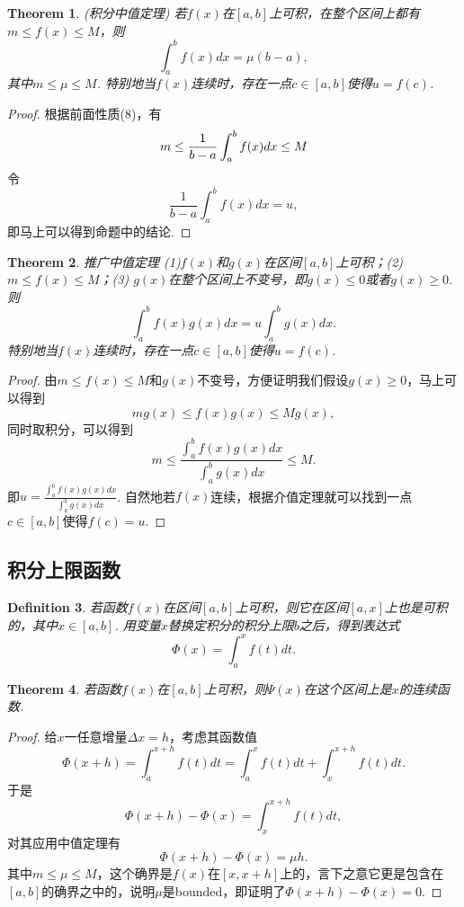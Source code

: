\documentclass{article}
\newtheorem{theorem}{Theorem}[section]
\newtheorem{definition}[theorem]{Definition}
\begin{document}
\begin{theorem}
\rm {\color{red} (积分中值定理) } 若$f(x)$在$[a,b]$上可积，在整个区间上都有$m \leq f(x) \leq M$，则
$$
\int_a^b f(x)dx = \mu(b-a),
$$
其中$m\leq \mu \leq M$. 特别地当$f(x)$连续时，存在一点$c\in [a,b]$使得$u=f(c)$.  
\end{theorem}

\begin{proof}
根据前面性质(8)，有
$$
m \leq \frac{1}{b-a}\int_a^b f(x)dx \leq M \\
$$
令
$$
\frac{1}{b-a}\int_a^b f(x)dx = u,
$$
即马上可以得到命题中的结论.
\end{proof}

\begin{theorem}
\rm {\color{red} 推广中值定理} (1)$f(x)$和$g(x)$在区间$[a,b]$上可积；(2)$m\leq f(x) \leq M$；(3) $g(x)$在整个区间上不变号，即$g(x) \leq 0$或者$g(x) \geq 0$. 则
$$
\int_a^b f(x)g(x)dx = u\int_a^b g(x)dx.
$$
特别地当$f(x)$连续时，存在一点$c\in [a,b]$使得$u=f(c)$.  
\end{theorem}

\begin{proof}
由$m \leq f(x) \leq M$和$g(x)$不变号，方便证明我们假设$g(x) \geq 0$，马上可以得到
$$
mg(x) \leq f(x)g(x) \leq Mg(x),
$$
同时取积分，可以得到
$$
m \leq \frac{\int_a^b f(x)g(x)dx}{\int_a^b g(x)dx} \leq M.
$$
即$u = \frac{\int_a^b f(x)g(x)dx}{\int_a^b g(x)dx}$. 自然地若$f(x)$连续，根据介值定理就可以找到一点$c \in [a,b]$使得$f(c) = u$.
\end{proof}




\subsection{积分上限函数}

\begin{definition}
\rm 若函数$f(x)$在区间$[a,b]$上可积，则它在区间$[a,x]$上也是可积的，其中$x \in [a,b]$. 用变量$x$替换定积分的积分上限$b$之后，得到表达式
$$
\Phi(x) = \int_a^x f(t)dt.
$$
\end{definition}

\begin{theorem}
\rm 若函数$f(x)$在$[a,b]$上可积，则$\Psi(x)$在这个区间上是$x$的连续函数.
\end{theorem}

\begin{proof}
给$x$一任意增量$\Delta x = h$，考虑其函数值
$$
\Phi(x+h) = \int_a^{x+h} f(t)dt = \int_a^x f(t)dt  + \int_x^{x+h} f(t)dt.
$$
于是
$$
\Phi(x+h) - \Phi(x) = \int_x^{x+h} f(t)dt,
$$
对其应用中值定理有
$$
\Phi(x+h) - \Phi(x)  = \mu h.
$$
其中$m \leq \mu \leq M$，这个确界是$f(x)$在$[x,x+h]$上的，言下之意它更是包含在$[a,b]$的确界之中的，说明$\mu$是bounded，即证明了$\Phi(x+h) - \Phi(x) = 0$.
\end{proof}
\end{document}
